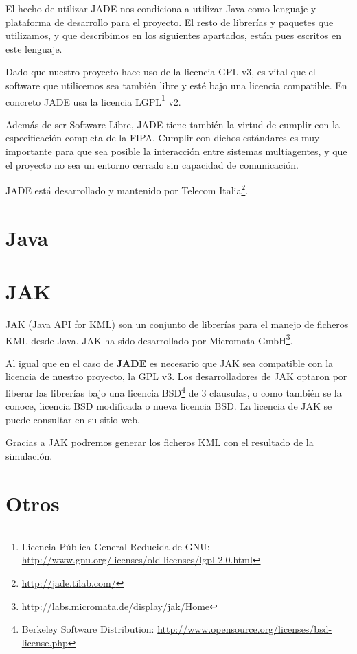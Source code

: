 El hecho de utilizar JADE nos condiciona a utilizar Java como lenguaje y
plataforma de desarrollo para el proyecto. El resto de librerías y paquetes que
utilizamos, y que describimos en los siguientes apartados, están pues escritos
en este lenguaje.

Dado que nuestro proyecto hace uso de la licencia GPL v3, es vital que el
software que utilicemos sea también libre y esté bajo una licencia compatible.
En concreto JADE usa la licencia LGPL\footnote{Licencia Pública General Reducida
de GNU: \url{http://www.gnu.org/licenses/old-licenses/lgpl-2.0.html}} v2.

Además de ser Software Libre, JADE tiene también la virtud de cumplir con la
especificación completa de la FIPA. Cumplir con dichos estándares es muy
importante para que sea posible la interacción entre sistemas multiagentes, y
que el proyecto no sea un entorno cerrado sin capacidad de comunicación.

JADE está desarrollado y mantenido por Telecom
Italia\footnote{\url{http://jade.tilab.com/}}.

\section*{Java}

\section*{JAK}

JAK (Java API for KML) son un conjunto de librerías para el manejo de ficheros
KML desde Java. JAK ha sido desarrollado por Micromata
GmbH\footnote{\url{http://labs.micromata.de/display/jak/Home}}.


Al igual que en el caso de {\bf JADE} es necesario que JAK sea compatible con
la licencia de nuestro proyecto, la GPL v3. %
Los desarrolladores de JAK optaron por liberar las librerías bajo una licencia
BSD\footnote{Berkeley Software Distribution:
\url{http://www.opensource.org/licenses/bsd-license.php}} de 3 clausulas, o como
también se la conoce, licencia BSD modificada o nueva licencia BSD. La licencia
de JAK se puede consultar en su sitio web.

Gracias a JAK podremos generar los ficheros KML con el resultado de la
simulación.

\section*{Otros}

